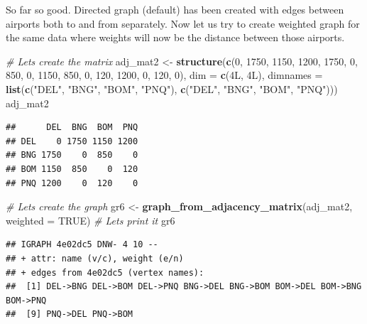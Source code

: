 \documentclass[
]{book}
\newenvironment{Shaded}{\begin{snugshade}}{\end{snugshade}}
\newcommand{\AttributeTok}[1]{\textcolor[rgb]{0.13,0.29,0.53}{#1}}
\newcommand{\CommentTok}[1]{\textcolor[rgb]{0.56,0.35,0.01}{\textit{#1}}}
\newcommand{\ConstantTok}[1]{\textcolor[rgb]{0.56,0.35,0.01}{#1}}
\newcommand{\DecValTok}[1]{\textcolor[rgb]{0.00,0.00,0.81}{#1}}
\newcommand{\FunctionTok}[1]{\textcolor[rgb]{0.13,0.29,0.53}{\textbf{#1}}}
\newcommand{\NormalTok}[1]{#1}
\newcommand{\OtherTok}[1]{\textcolor[rgb]{0.56,0.35,0.01}{#1}}
\newcommand{\StringTok}[1]{\textcolor[rgb]{0.31,0.60,0.02}{#1}}
\begin{document}
So far so good. Directed graph (default) has been created with edges between airports both to and from separately. Now let us try to create weighted graph for the same data where weights will now be the distance between those airports.

\begin{Shaded}
\begin{Highlighting}[]
\CommentTok{\# Let\textquotesingle{}s create the matrix}
\NormalTok{adj\_mat2 }\OtherTok{\textless{}{-}} \FunctionTok{structure}\NormalTok{(}\FunctionTok{c}\NormalTok{(}\DecValTok{0}\NormalTok{, }\DecValTok{1750}\NormalTok{, }\DecValTok{1150}\NormalTok{, }\DecValTok{1200}\NormalTok{, }\DecValTok{1750}\NormalTok{, }\DecValTok{0}\NormalTok{, }\DecValTok{850}\NormalTok{, }\DecValTok{0}\NormalTok{, }\DecValTok{1150}\NormalTok{, }\DecValTok{850}\NormalTok{, }
\DecValTok{0}\NormalTok{, }\DecValTok{120}\NormalTok{, }\DecValTok{1200}\NormalTok{, }\DecValTok{0}\NormalTok{, }\DecValTok{120}\NormalTok{, }\DecValTok{0}\NormalTok{), }\AttributeTok{dim =} \FunctionTok{c}\NormalTok{(4L, 4L), }\AttributeTok{dimnames =} \FunctionTok{list}\NormalTok{(}\FunctionTok{c}\NormalTok{(}\StringTok{"DEL"}\NormalTok{, }
\StringTok{"BNG"}\NormalTok{, }\StringTok{"BOM"}\NormalTok{, }\StringTok{"PNQ"}\NormalTok{), }\FunctionTok{c}\NormalTok{(}\StringTok{"DEL"}\NormalTok{, }\StringTok{"BNG"}\NormalTok{, }\StringTok{"BOM"}\NormalTok{, }\StringTok{"PNQ"}\NormalTok{)))}
\NormalTok{adj\_mat2}
\end{Highlighting}
\end{Shaded}

\begin{verbatim}
##      DEL  BNG  BOM  PNQ
## DEL    0 1750 1150 1200
## BNG 1750    0  850    0
## BOM 1150  850    0  120
## PNQ 1200    0  120    0
\end{verbatim}

\begin{Shaded}
\begin{Highlighting}[]
\CommentTok{\# Let\textquotesingle{}s create the graph}
\NormalTok{gr6 }\OtherTok{\textless{}{-}} \FunctionTok{graph\_from\_adjacency\_matrix}\NormalTok{(adj\_mat2, }\AttributeTok{weighted =} \ConstantTok{TRUE}\NormalTok{)}
\CommentTok{\# Let\textquotesingle{}s print it}
\NormalTok{gr6}
\end{Highlighting}
\end{Shaded}

\begin{verbatim}
## IGRAPH 4e02dc5 DNW- 4 10 -- 
## + attr: name (v/c), weight (e/n)
## + edges from 4e02dc5 (vertex names):
##  [1] DEL->BNG DEL->BOM DEL->PNQ BNG->DEL BNG->BOM BOM->DEL BOM->BNG BOM->PNQ
##  [9] PNQ->DEL PNQ->BOM
\end{verbatim}
\end{document}
